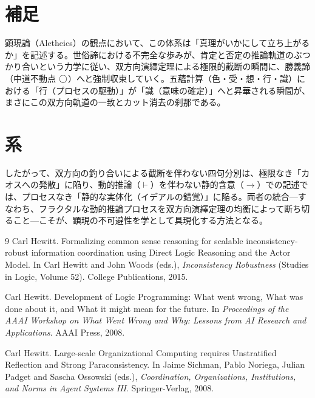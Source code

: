 \documentclass[11pt,a4paper]{article}
\begin{document}
\section{補足}
顕現論（Aletheics）の観点において、この体系は「真理がいかにして立ち上がるか」を記述する。世俗諦における不完全な歩みが、肯定と否定の推論軌道のぶつかり合いという力学に従い、双方向演繹定理による極限的截断の瞬間に、勝義諦（中道不動点 $\bigcirc$）へと強制収束していく。五蘊計算（色・受・想・行・識）における「行（プロセスの駆動）」が「識（意味の確定）」へと昇華される瞬間が、まさにこの双方向軌道の一致とカット消去の刹那である。

\section{系}
したがって、双方向の釣り合いによる截断を伴わない四句分別は、極限なき「カオスへの発散」に陥り、動的推論（$\vdash$）を伴わない静的含意（$\rightarrow$）での記述では、プロセスなき「静的な実体化（イデアルの錯覚）」に陥る。両者の統合---すなわち、フラクタルな動的推論プロセスを双方向演繹定理の均衡によって断ち切ること---こそが、顕現の不可避性を学として具現化する方法となる。


\begin{thebibliography}{9}
Carl Hewitt.
\newblock Formalizing common sense reasoning for scalable inconsistency-robust information coordination using Direct Logic Reasoning and the Actor Model.
\newblock In Carl Hewitt and John Woods (eds.), \emph{Inconsistency Robustness} (Studies in Logic, Volume 52). College Publications, 2015.

Carl Hewitt.
\newblock Development of Logic Programming: What went wrong, What was done about it, and What it might mean for the future.
\newblock In \emph{Proceedings of the AAAI Workshop on What Went Wrong and Why: Lessons from AI Research and Applications}. AAAI Press, 2008.

Carl Hewitt.
\newblock Large-scale Organizational Computing requires Unstratified Reflection and Strong Paraconsistency.
\newblock In Jaime Sichman, Pablo Noriega, Julian Padget and Sascha Ossowski (eds.), \emph{Coordination, Organizations, Institutions, and Norms in Agent Systems III}. Springer-Verlag, 2008.

\end{thebibliography}
\end{document}

